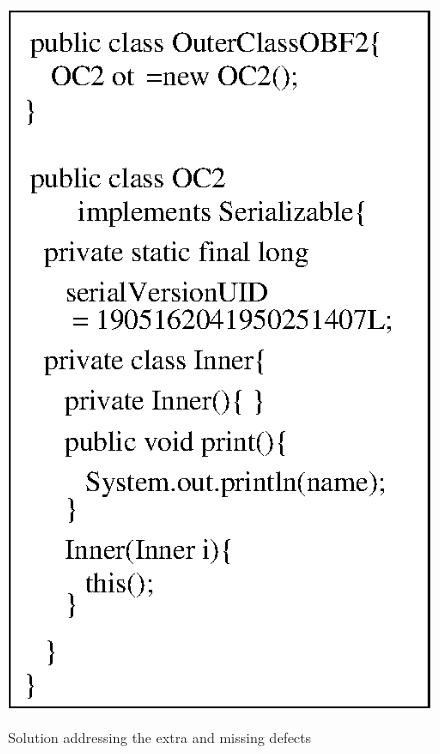 \documentclass[twocolumn]{article}
\begin{document}
\begin{figure}[ht!]
{       \includegraphics[scale=0.6]{./prog6.eps}
	\label{fig:obfinnercls2}
}
\caption{Solution addressing the extra and missing defects}
\label{fig:missingdefects}
\end{figure}
%  
\end{document}
